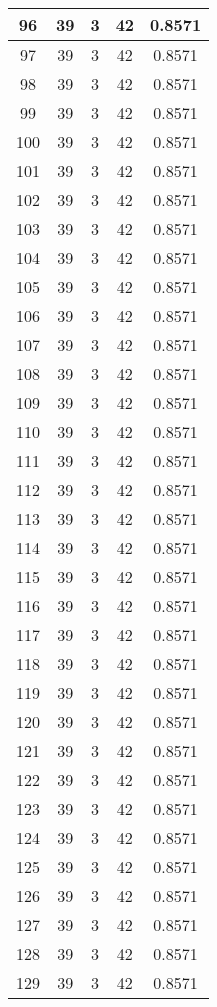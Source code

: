 \documentclass[letterpaper, 12pt]{article}
\begin{document}
\begin{longtable}{|c|c|c|c|c|}
\hline
96 & 39 & 3 & 42 & 0.8571 \\
\hline
97 & 39 & 3 & 42 & 0.8571 \\
\hline
98 & 39 & 3 & 42 & 0.8571 \\
\hline
99 & 39 & 3 & 42 & 0.8571 \\
\hline
100 & 39 & 3 & 42 & 0.8571 \\
\hline
101 & 39 & 3 & 42 & 0.8571 \\
\hline
102 & 39 & 3 & 42 & 0.8571 \\
\hline
103 & 39 & 3 & 42 & 0.8571 \\
\hline
104 & 39 & 3 & 42 & 0.8571 \\
\hline
105 & 39 & 3 & 42 & 0.8571 \\
\hline
106 & 39 & 3 & 42 & 0.8571 \\
\hline
107 & 39 & 3 & 42 & 0.8571 \\
\hline
108 & 39 & 3 & 42 & 0.8571 \\
\hline
109 & 39 & 3 & 42 & 0.8571 \\
\hline
110 & 39 & 3 & 42 & 0.8571 \\
\hline
111 & 39 & 3 & 42 & 0.8571 \\
\hline
112 & 39 & 3 & 42 & 0.8571 \\
\hline
113 & 39 & 3 & 42 & 0.8571 \\
\hline
114 & 39 & 3 & 42 & 0.8571 \\
\hline
115 & 39 & 3 & 42 & 0.8571 \\
\hline
116 & 39 & 3 & 42 & 0.8571 \\
\hline
117 & 39 & 3 & 42 & 0.8571 \\
\hline
118 & 39 & 3 & 42 & 0.8571 \\
\hline
119 & 39 & 3 & 42 & 0.8571 \\
\hline
120 & 39 & 3 & 42 & 0.8571 \\
\hline
121 & 39 & 3 & 42 & 0.8571 \\
\hline
122 & 39 & 3 & 42 & 0.8571 \\
\hline
123 & 39 & 3 & 42 & 0.8571 \\
\hline
124 & 39 & 3 & 42 & 0.8571 \\
\hline
125 & 39 & 3 & 42 & 0.8571 \\
\hline
126 & 39 & 3 & 42 & 0.8571 \\
\hline
127 & 39 & 3 & 42 & 0.8571 \\
\hline
128 & 39 & 3 & 42 & 0.8571 \\
\hline
129 & 39 & 3 & 42 & 0.8571 \\

\end{longtable}
\end{document}
